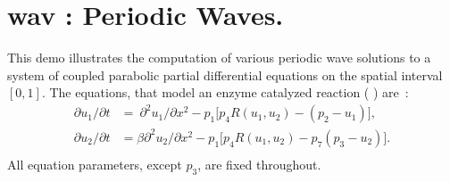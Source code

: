 \documentclass[12pt]{report}
\begin{document}
\newpage
\section{ wav : Periodic Waves.} \label{sec:Demos_wav}
This demo illustrates the computation of various periodic wave solutions
to a system of coupled parabolic partial differential equations
on the spatial interval $[0,1]$.
The equations, that model an enzyme catalyzed reaction 
( \citeyear{DoKe:86a}) are~:
\begin{equation} \begin{array}{cl}
 {\partial u_1 / \partial t}
  &=
  ~{\partial^{2} u_1 / \partial x^{2}}
  -p_1 \bigl[p_4 R(u_1,u_2) - (p_2 - u_1) \bigr] ,\\
 {\partial u_2 / \partial t}
  &=
  \beta {\partial^{2} u_2 / \partial x^{2}}
  -p_1 \bigl[p_4 R(u_1,u_2) - p_7 (p_3 - u_2) \bigr].\\
\end{array} \end{equation}
All equation parameters, except $p_3$, are fixed throughout.
\end{document}
